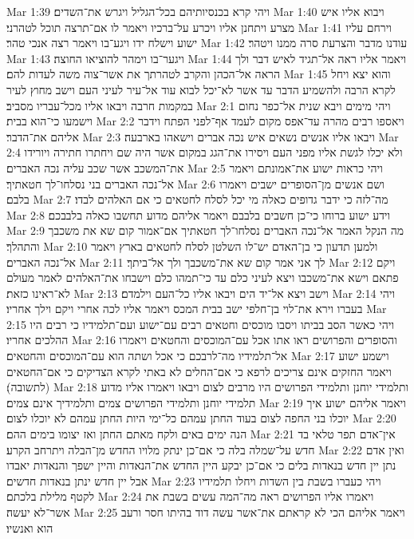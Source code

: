Mar 1:39  ויהי קרא בכנסיותיהם בכל־הגליל ויגרש את־השדים׃
Mar 1:40  ויבוא אליו איש מצרע ויתחנן אליו ויכרע על־ברכיו ויאמר לו אם־תרצה תוכל לטהרני׃
Mar 1:41  וירחם עליו ישוע וישלח ידו ויגע־בו ויאמר רצה אנכי טהר׃
Mar 1:42  עודנו מדבר והצרעת סרה ממנו ויטהר׃
Mar 1:43  ויגער־בו וימהר להוציאו החוצה׃
Mar 1:44  ויאמר אליו ראה אל־תגיד לאיש דבר ולך הראה אל־הכהן והקרב לטהרתך את אשר־צוה משה לעדות להם׃
Mar 1:45  והוא יצא ויחל לקרא הרבה ולהשמיע הדבר עד אשר לא־יכל לבוא עוד אל־עיר לעיני העם וישב מחוץ לעיר במקמות חרבה ויבאו אליו מכל־עבריו מסביב׃
Mar 2:1  ויהי מימים ויבא שנית אל־כפר נחום וישמעו כי־הוא בבית׃
Mar 2:2  ויאספו רבים מהרה עד־אפס מקום לעמד אף־לפני הפתח וידבר אליהם את־הדבר׃
Mar 2:3  ויבאו אליו אנשים נשאים איש נכה אברים וישאהו בארבעה׃
Mar 2:4  ולא יכלו לגשת אליו מפני העם ויסירו את־הגג במקום אשר היה שם ויחתרו חתירה ויורידו את־המשכב אשר שכב עליה נכה האברים׃
Mar 2:5  ויהי כראות ישוע את־אמונתם ויאמר אל־נכה האברים בני נסלחו־לך חטאתיך׃
Mar 2:6  ושם אנשים מן־הסופרים ישבים ויאמרו בלבם׃
Mar 2:7  מה־לזה כי ידבר גדופים כאלה מי יכל לסלח לחטאים כי אם האלהים לבדו׃
Mar 2:8  וידע ישוע ברוחו כי־כן חשבים בלבבם ויאמר אליהם מדוע תחשבו כאלה בלבבכם׃
Mar 2:9  מה הנקל האמר אל־נכה האברים נסלחו־לך חטאתיך אם־אמור קום שא את משכבך והתהלך׃
Mar 2:10  ולמען תדעון כי בן־האדם יש־לו השלטן לסלח לחטאים בארץ ויאמר אל־נכה האברים׃
Mar 2:11  לך אני אמר קום שא את־משכבך ולך אל־ביתך׃
Mar 2:12  ויקם פתאם וישא את־משכבו ויצא לעיני כלם עד כי־תמהו כלם וישבחו את־האלהים לאמר מעולם לא־ראינו כזאת׃
Mar 2:13  וישב ויצא אל־יד הים ויבאו אליו כל־העם וילמדם׃
Mar 2:14  ויהי בעברו וירא את־לוי בן־חלפי ישב בבית המכס ויאמר אליו לכה אחרי ויקם וילך אחריו׃
Mar 2:15  ויהי כאשר הסב בביתו ויסבו מוכסים וחטאים רבים עם־ישוע ועם־תלמידיו כי רבים היו ההלכים אחריו׃
Mar 2:16  והסופרים והפרושים ראו אתו אכל עם־המוכסים והחטאים ויאמרו אל־תלמידיו מה־לרבכם כי אכל ושתה הוא עם־המוכסים והחטאים׃
Mar 2:17  וישמע ישוע ויאמר החזקים אינם צריכים לרפא כי אם־החלים לא באתי לקרא הצדיקים כי אם־החטאים (לתשובה)׃
Mar 2:18  ותלמידי יוחנן ותלמידי הפרושים היו מרבים לצום ויבאו ויאמרו אליו מדוע תלמידי יוחנן ותלמידי הפרושים צמים ותלמידיך אינם צמים׃
Mar 2:19  ויאמר אליהם ישוע איך יוכלו בני החפה לצום בעוד החתן עמהם כל־ימי היות החתן עמהם לא יוכלו לצום׃
Mar 2:20  הנה ימים באים ולקח מאתם החתן ואז יצומו בימים ההם׃
Mar 2:21  אין־אדם תפר טלאי בד חדש על־שמלה בלה כי אם־כן ינתק מלויו החדש מן־הבלה ויתרחב הקרע׃
Mar 2:22  ואין אדם נתן יין חדש בנאדות בלים כי אם־כן יבקע היין החדש את־הנאדות והיין ישפך והנאדות יאבדו אבל יין חדש ינתן בנאדות חדשים׃
Mar 2:23  ויהי כעברו בשבת בין השדות ויחלו תלמידיו לקטף מלילת בלכתם׃
Mar 2:24  ויאמרו אליו הפרושים ראה מה־המה עשים בשבת את אשר־לא יעשה׃
Mar 2:25  ויאמר אליהם הכי לא קראתם את־אשר עשה דוד בהיתו חסר ורעב הוא ואנשיו׃
